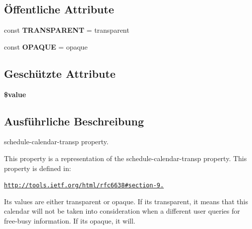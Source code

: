 \subsection*{Öffentliche Attribute}
\begin{DoxyCompactItemize}
\item 
\mbox{\label{class_sabre_1_1_cal_d_a_v_1_1_xml_1_1_property_1_1_schedule_calendar_transp_ac02f19259646672c0d1d05982f71c453}} 
const {\bfseries T\+R\+A\+N\+S\+P\+A\+R\+E\+NT} = \textquotesingle{}transparent\textquotesingle{}
\item 
\mbox{\label{class_sabre_1_1_cal_d_a_v_1_1_xml_1_1_property_1_1_schedule_calendar_transp_a033101bc374d07533cb24d2b84e28f85}} 
const {\bfseries O\+P\+A\+Q\+UE} = \textquotesingle{}opaque\textquotesingle{}
\end{DoxyCompactItemize}
\subsection*{Geschützte Attribute}
\begin{DoxyCompactItemize}
\item 
\mbox{\label{class_sabre_1_1_cal_d_a_v_1_1_xml_1_1_property_1_1_schedule_calendar_transp_a560429adeaec103915e865b5e891f8d1}} 
{\bfseries \$value}
\end{DoxyCompactItemize}


\subsection{Ausführliche Beschreibung}
schedule-\/calendar-\/transp property.

This property is a representation of the schedule-\/calendar-\/transp property. This property is defined in\+:

\href{http://tools.ietf.org/html/rfc6638#section-9.1}{\tt http\+://tools.\+ietf.\+org/html/rfc6638\#section-\/9.}

Its values are either \textquotesingle{}transparent\textquotesingle{} or \textquotesingle{}opaque\textquotesingle{}. If it\textquotesingle{}s transparent, it means that this calendar will not be taken into consideration when a different user queries for free-\/busy information. If it\textquotesingle{}s \textquotesingle{}opaque\textquotesingle{}, it will.

